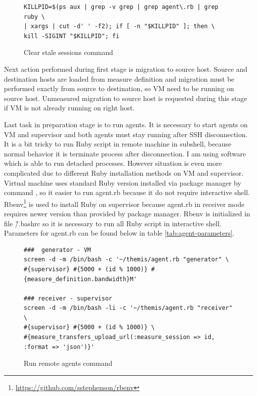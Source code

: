 \begin{figure}[htb]
\caption{Clear stale sessions command}
\label{cmd:killcmd}
\begin{verbatim}
KILLPID=$(ps aux | grep -v grep | grep agent\.rb | grep ruby \
| xargs | cut -d' ' -f2); if [ -n "$KILLPID" ]; then \
kill -SIGINT "$KILLPID"; fi 
\end{verbatim}
\end{figure}

Next action performed during first stage is migration to source host. Source and destination hosts are loaded from measure definition and migration must be performed exactly from source to destination, so \Ac{VM} need to be running on source host. Unmeasured migration to source host is requested during this stage if \Ac{VM} is not already running on right host.

Last task in preparation stage is to run agents. It is necessary to start agents on \Ac{VM} and supervisor and both agents must stay running after \Ac{SSH} disconnection. It is a bit tricky to run Ruby script in remote machine in subshell, because normal behavior it is terminate process after disconnection. I am using \Cmd{screen} software which is able to run detached processes. However situation is even more complicated due to different Ruby installation methods on \Ac{VM} and supervisor. Virtual machine uses standard Ruby version installed via package manager by command , so it easier to run agent.rb because it do not require interactive shell. Rbenv\footnote{\url{https://github.com/sstephenson/rbenv}} is used to install Ruby on supervisor because agent.rb in receiver mode requires newer version than provided by package manager. Rbenv is initialized in file \~/.bashrc so it is necessary to run all Ruby script in interactive shell. Parameters for agent.rb can be found below in table \ref{tab:agent-parameters}.

\begin{figure}[htb]
\caption{Run remote agents command}
\label{cmd:remote agents}
\begin{verbatim}
###  generator - VM
screen -d -m /bin/bash -c '~/themis/agent.rb "generator" \
#{supervisor} #{5000 + (id % 1000)} #{measure_definition.bandwidth}M'

### receiver - supervisor
screen -d -m /bin/bash -li -c '~/themis/agent.rb "receiver" \
#{supervisor} #{5000 + (id % 1000)} \
#{measure_transfers_upload_url(:measure_session => id, :format => 'json')}'
\end{verbatim}
\end{figure}



